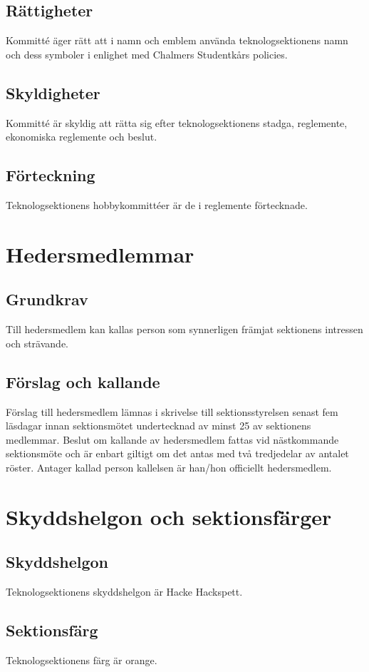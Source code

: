 \documentclass[a4paper]{dtek}
\begin{document}
\subsection{Rättigheter}
Kommitté äger rätt att i namn och emblem använda teknologsektionens namn och dess symboler i enlighet med Chalmers Studentkårs policies.
\subsection{Skyldigheter}
Kommitté är skyldig att rätta sig efter teknologsektionens stadga, reglemente, ekonomiska reglemente och beslut.
\subsection{Förteckning}
Teknologsektionens hobbykommittéer är de i reglemente förtecknade.
\newpage

\section{Hedersmedlemmar}
\subsection{Grundkrav}
Till hedersmedlem kan kallas person som synnerligen främjat sektionens intressen och strävande.
\subsection{Förslag och kallande}
Förslag till hedersmedlem lämnas i skrivelse till sektionsstyrelsen senast fem läsdagar innan sektionsmötet undertecknad av minst 25 av sektionens medlemmar. Beslut om kallande av hedersmedlem fattas vid nästkommande sektionsmöte och är enbart giltigt om det antas med två tredjedelar av antalet röster. Antager kallad person kallelsen är han/hon officiellt hedersmedlem.
\newpage

\section{Skyddshelgon och sektionsfärger}
\subsection{Skyddshelgon}
Teknologsektionens skyddshelgon är Hacke Hackspett.
\subsection{Sektionsfärg}
Teknologsektionens färg är orange.
\newpage
\end{document}
